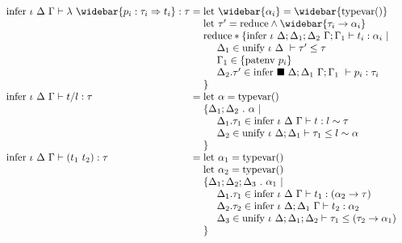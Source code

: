\documentclass[manuscript]{acmart}
\begin{document}
\begin{figure*}[h]
\[\begin{array}{l @{} l}
      \text{infer } \iota\ \Delta\ \Gamma \vdash 
      \lambda\ \widebar{p_i : \tau_i \Rightarrow t_i} : \tau
      &{} =
      \begin{array}[t]{@{} l}
        \text{let } \widebar{\alpha_i} = \widebar{\text{typevar}()}
        \\
        \text{let } \tau' = \text{reduce} \wedge 
        \widebar{\tau_i \rightarrow \alpha_i }
        \\
        \text{reduce} * \{
        \text{infer } \iota\ \Delta;\Delta_1;\Delta_2\ \Gamma;\Gamma_1 \vdash t_i : \alpha_i\ |\ 
        \\
        \ \ \ \ \Delta_1 \in \text{unify } \iota\ \Delta\ \vdash \tau' \leq \tau
        \\
        \ \ \ \ \Gamma_1 \in \{\text{patenv } p_i\}
        \\
        \ \ \ \ \Delta_2.\tau' \in \text{infer } \blacksquare\ \Delta;\Delta_1\ \Gamma;\Gamma_1\ \vdash p_i : \tau_i
        \\
        \}
        \\
      \end{array}
      \\

      \text{infer } \iota\ \Delta\ \Gamma \vdash 
      t/l : \tau
      &{} =
      \begin{array}[t]{@{} l}
        \text{let } \alpha = \text{typevar}()
        \\
        \{ \Delta_1;\Delta_2\ .\ \alpha \ |\
        \\
        \ \ \ \ \Delta_1.\tau_1 \in \text{infer } \iota\ \Delta\ \Gamma \vdash t : l \sim \tau 
        \\
        \ \ \ \ \Delta_2 \in \text{unify } \iota\ \Delta;\Delta_1 \vdash \tau_1 \leq l \sim \alpha
        \\
        \}
      \end{array}
      \\

      \text{infer } \iota\ \Delta\ \Gamma \vdash 
      (t_1\ t_2) : \tau
      &{} =
      \begin{array}[t]{@{} l}
        \text{let } \alpha_1 = \text{typevar}()
        \\
        \text{let } \alpha_2 = \text{typevar}()
        \\
        \{ \Delta_1;\Delta_2;\Delta_3\ .\ \alpha_1 \ |\
        \\
        \ \ \ \ \Delta_1.\tau_1 \in \text{infer } \iota\ \Delta\ \Gamma \vdash t_1 : (\alpha_2 \rightarrow \tau) 
        \\
        \ \ \ \ \Delta_2.\tau_2 \in \text{infer } \iota\ \Delta;\Delta_1\ \Gamma \vdash t_2 : \alpha_2
        \\
        \ \ \ \ \Delta_3 \in \text{unify } \iota\ \Delta;\Delta_1;\Delta_2 \vdash 
        \tau_1 \leq (\tau_2 \rightarrow \alpha_1)
        \\
        \}
      \end{array}
      \\


\end{array}\]
\end{figure*}
\end{document}
